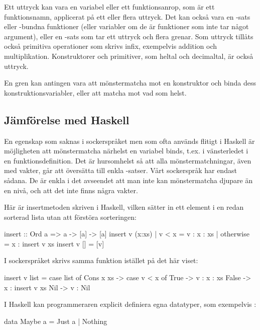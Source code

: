 \documentclass[Rapport]{subfiles}
\begin{document}
    Ett uttryck kan vara en variabel eller ett funktionsanrop, som är ett
funktionsnamn, applicerat på ett eller flera uttryck. Det kan också vara en -sats eller
-bundna funktioner (eller variabler om de är funktioner som
inte tar något argument), eller en -sats som tar ett uttryck och flera grenar.
Som uttryck tillåts också primitiva operationer som skrivs infix, exempelvis addition 
och multiplikation. Konstruktorer och primitiver, som heltal och decimaltal, är också uttryck.

    En gren kan antingen vara att mönstermatcha mot en konstruktor och binda
dess konstruktionsvariabler, eller att matcha mot vad som helst.


\subsection{Jämförelse med Haskell}

    En egenskap som saknas i sockerspråket men som ofta används flitigt i Haskell är 
möjligheten att mönstermatcha närhelst en variabel binds, t.ex. i vänsterledet
i en funktionsdefinition. Det är hursomhelst så att alla mönstermatchningar,
även med vakter, går att översätta till enkla -satser. Vårt sockerspråk
har endast sådana. De är enkla i det avseendet att man inte kan mönstermatcha djupare
än en nivå, och att det inte finns några vakter.

Här är insertmetoden skriven i Haskell, vilken sätter in ett element i en redan sorterad
lista utan att förstöra sorteringen:

\begin{codeEx}
  insert :: Ord a => a -> [a] -> [a]
  insert v (x:xs) 
      | v < x     = v : x : xs
      | otherwise = x : insert v xs 
  insert v [] = [v]
\end{codeEx}                  

I sockerspråket skrivs samma funktion istället på det här viset:

\begin{codeEx}
  insert v list = case list of
      Cons x xs -> case v < x of
          True  -> v : x : xs
          False -> x : insert v xs
      Nil -> v : Nil
\end{codeEx}

I Haskell kan programmeraren explicit definiera egna datatyper, som exempelvis :
    
\begin{codeEx}
data Maybe a = Just a | Nothing
\end{codeEx}
\end{document}
